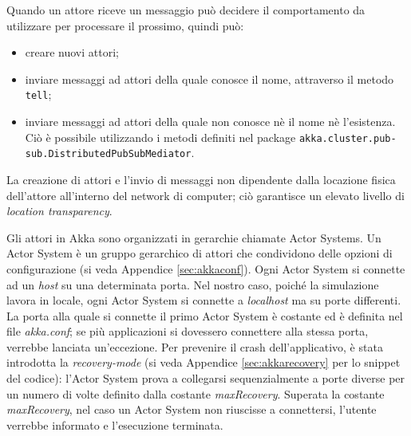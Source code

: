 Quando un attore riceve un messaggio può decidere il comportamento
da utilizzare per processare il prossimo, quindi può:
\begin{itemize}
	\item creare nuovi attori;
	\item inviare messaggi ad attori della quale conosce il nome, attraverso il metodo \texttt{tell};
	\item inviare messaggi ad attori della quale non conosce nè il nome nè l'esistenza.
	Ciò è possibile utilizzando i metodi definiti nel package \texttt{akka.cluster.pub- sub.DistributedPubSubMediator}.
\end{itemize}
La creazione di attori e l'invio di messaggi non dipendente dalla
locazione fisica dell'attore all'interno del network di computer;
ciò garantisce un elevato livello di \emph{location transparency}.

Gli attori in Akka sono organizzati in gerarchie chiamate Actor Systems.
Un Actor System è un gruppo gerarchico di attori che condividono delle
opzioni di configurazione (si veda Appendice \ref{sec:akkaconf}). Ogni Actor System si connette ad un \emph{host} su una determinata porta. Nel nostro caso, poiché la simulazione lavora in locale, ogni Actor System si connette a \emph{localhost} ma su porte differenti. La porta alla quale si connette il primo Actor System è costante ed è definita nel file \emph{akka.conf}; se più applicazioni si dovessero connettere alla stessa porta, verrebbe lanciata un'eccezione. Per prevenire il crash dell'applicativo, è stata introdotta la \emph{recovery-mode} (si veda Appendice \ref{sec:akkarecovery} per lo snippet del codice): l'Actor System prova a collegarsi sequenzialmente a porte diverse per un numero di volte definito dalla costante \emph{maxRecovery}. Superata la costante \emph{maxRecovery}, nel caso un Actor System non riuscisse a connettersi, l'utente verrebbe informato e l'esecuzione terminata.\\


